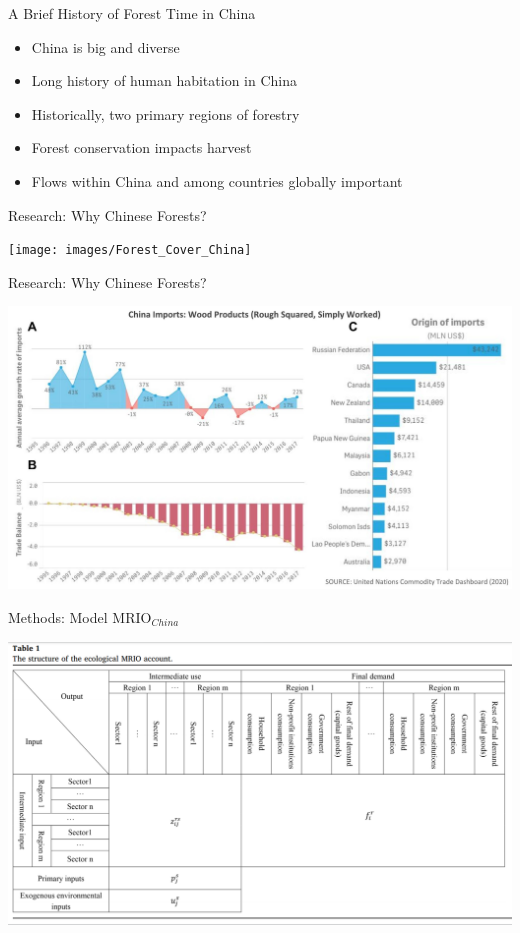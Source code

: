 \documentclass[ignorenonframetext,]{beamer}
\providecommand{\tightlist}{%
  \setlength{\itemsep}{0pt}\setlength{\parskip}{0pt}}
\begin{document}
\begin{frame}{A Brief History of Forest Time in China}
\protect\hypertarget{a-brief-history-of-forest-time-in-china}{}

\begin{itemize}
\tightlist
\item
  China is big and diverse
\item
  Long history of human habitation in China
\item
  Historically, two primary regions of forestry
\item
  Forest conservation impacts harvest
\item
  Flows within China and among countries globally important
\end{itemize}

\end{frame}

\begin{frame}{Research: Why Chinese Forests?}
\protect\hypertarget{research-why-chinese-forests-1}{}

\begin{center}\texttt{[image: images/Forest\_Cover\_China]} \end{center}

\end{frame}

\begin{frame}{Research: Why Chinese Forests?}
\protect\hypertarget{research-why-chinese-forests-2}{}

\begin{center}\includegraphics[width=0.5\linewidth]{images/comtrade_china_imports_wood} \end{center}

\end{frame}

\begin{frame}{Methods: Model MRIO\(_{China}\)}
\protect\hypertarget{methods-model-mrio_china}{}

\begin{center}\includegraphics[width=0.5\linewidth]{images/Wu_2018_Table1} \end{center}

\end{frame}
\end{document}
